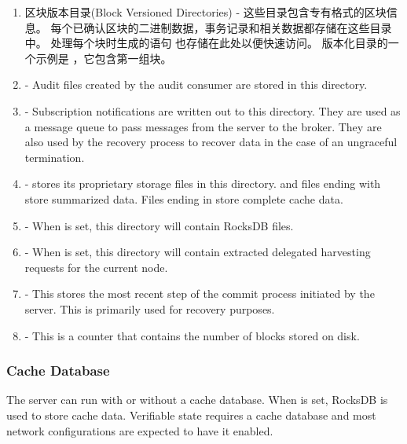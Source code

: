 \begin{enumerate}
	\item{区块版本目录(Block Versioned Directories) -
		这些目录包含专有格式的区块信息。
		每个已确认区块的二进制数据，事务记录和相关数据都存储在这些目录中。
		处理每个块时生成的语句 也存储在此处以便快速访问。
		版本化目录的一个示例是 ，它包含第一组块。
	}
	\item{ - Audit files created by the audit consumer  are stored in this directory.}
	\item{ -
		Subscription notifications are written out to this directory.
		They are used as a message queue to pass messages from the server to the broker.
		They are also used by the recovery process to recover data in the case of an ungraceful termination.
	}
	\item{ -
		\codenamespace stores its proprietary storage files in this directory.
		 and files ending with  store summarized data.
		Files ending in  store complete cache data.
	}
	\item{ - When  is set, this directory will contain RocksDB files.}
	\item{ -
		When  is set, this directory will contain extracted delegated harvesting requests for the current node.
	}
	\item{ -
		This stores the most recent step of the commit process initiated by the server.
		This is primarily used for recovery purposes.
	}
	\item{ - This is a counter that contains the number of blocks stored on disk.}
\end{enumerate}

\subsubsection{Cache Database}

The server can run with or without a cache database.
When  is set, RocksDB is used to store cache data.
Verifiable state  requires a cache database and most network configurations are expected to have it enabled.

